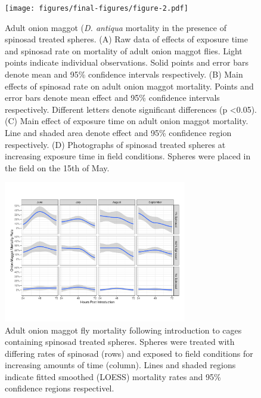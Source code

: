 \documentclass[alpha-refs]{wiley-article}
\begin{document}
\begin{figure}[bt]
\centering
\texttt{[image: figures/final-figures/figure-2.pdf]}
\caption{Adult onion maggot (\textit{D. antiqua} mortality in the presence of spinosad treated spheres.  (A) Raw data of effects of exposure time and spinosad rate on mortality of adult onion maggot flies.  Light points indicate individual observations.  Solid points and error bars denote mean and 95\% confidence intervals respectively.  (B) Main effects of spinosad rate on adult onion maggot mortality.  Points and error bars denote mean effect and 95\% confidence intervals respectively.  Different letters denote significant differences (p \textless 0.05).  (C) Main effect of exposure time on adult onion maggot mortality.  Line and shaded area denote effect and 95\% confidence region respectively.  (D) Photographs of spinosad treated spheres at increasing exposure time in field conditions.  Spheres were placed in the field on the 15th of May.  }
\label{fig:figure2}
\end{figure}


\begin{figure}[bt]
\centering
\includegraphics[width = 8cm]{figures/final-figures/figure-3.pdf}
\caption{Adult onion maggot fly mortality following introduction to cages containing spinosad treated spheres.  Spheres were treated with differing rates of spinosad (rows) and exposed to field conditions for increasing amounts of time (column).  Lines and shaded regions indicate fitted smoothed (LOESS) mortality rates and 95\% confidence regions respectivel.  }
\label{fig:figure3}
\end{figure}
\end{document}
